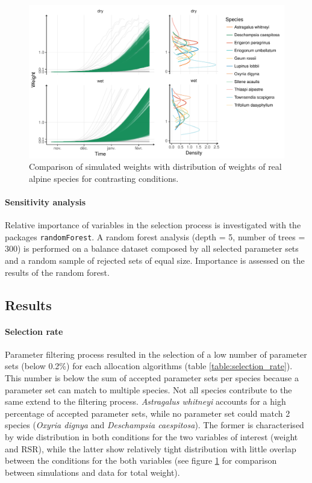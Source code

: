 \begin{figure}\label{fig:comparison_BM}
\includegraphics[width = \textwidth]{./2_PP/Figures/Calibration/weight_full_sim.pdf}
\caption{Comparison of simulated weights with distribution of weights of real alpine species for contrasting conditions.}
\end{figure}

\paragraph{Sensitivity analysis}
Relative importance of variables in the selection process is investigated with the packages \texttt{randomForest}. A random forest analysis (depth = 5, number of trees = 300) is performed on a balance dataset composed by all selected parameter sets and a random sample of rejected sets of equal size. Importance is assessed on the results of the random forest.

\subsection{Results}

\paragraph{Selection rate}
Parameter filtering process resulted in the selection of a low number of parameter sets (below 0.2\%) for each allocation algorithms (table \ref{table:selection_rate}). This number is below the sum of accepted parameter sets per species because a parameter set can match to multiple species. Not all species contribute to the same extend to the filtering process. \textit{Astragalus whitneyi} accounts for a high percentage of accepted parameter sets, while no parameter set could match 2 species (\textit{Oxyria dignya} and \textit{Deschampsia caespitosa}). The former is characterised by wide distribution in both conditions for the two variables of interest (weight and RSR), while the latter show relatively tight distribution with little overlap between the conditions for the both variables (see figure \ref{fig:comparison_BM} for comparison between simulations and data for total weight).

